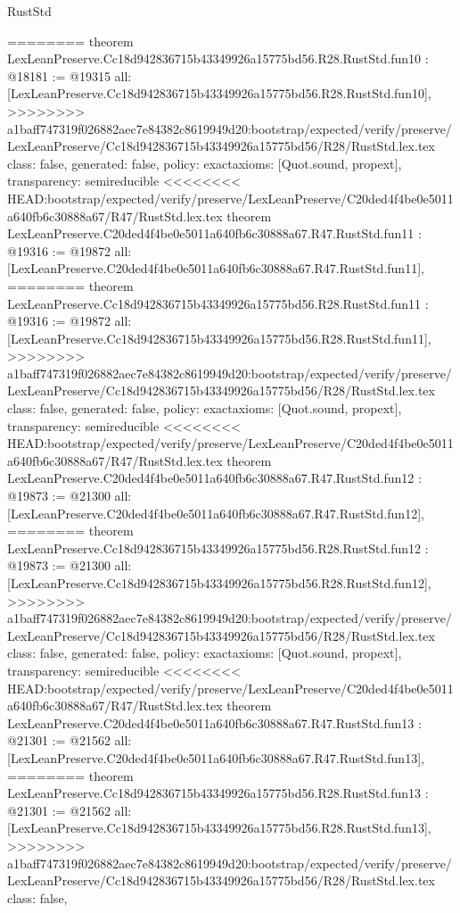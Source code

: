 \begin{lexlean}{RustStd}
\begin{coremodule}
{\begin{coremodule}
{{{{{{{{{{{{{========
theorem LexLeanPreserve.Cc18d942836715b43349926a15775bd56.R28.RustStd.fun10 : @18181 := @19315 {
  all: [LexLeanPreserve.Cc18d942836715b43349926a15775bd56.R28.RustStd.fun10],
>>>>>>>> a1baff747319f026882aec7e84382c8619949d20:bootstrap/expected/verify/preserve/LexLeanPreserve/Cc18d942836715b43349926a15775bd56/R28/RustStd.lex.tex
  class: false,
  generated: false,
  policy: exact{axioms: [Quot.sound, propext]},
  transparency: semireducible
}
<<<<<<<< HEAD:bootstrap/expected/verify/preserve/LexLeanPreserve/C20ded4f4be0e5011a640fb6c30888a67/R47/RustStd.lex.tex
theorem LexLeanPreserve.C20ded4f4be0e5011a640fb6c30888a67.R47.RustStd.fun11 : @19316 := @19872 {
  all: [LexLeanPreserve.C20ded4f4be0e5011a640fb6c30888a67.R47.RustStd.fun11],
========
theorem LexLeanPreserve.Cc18d942836715b43349926a15775bd56.R28.RustStd.fun11 : @19316 := @19872 {
  all: [LexLeanPreserve.Cc18d942836715b43349926a15775bd56.R28.RustStd.fun11],
>>>>>>>> a1baff747319f026882aec7e84382c8619949d20:bootstrap/expected/verify/preserve/LexLeanPreserve/Cc18d942836715b43349926a15775bd56/R28/RustStd.lex.tex
  class: false,
  generated: false,
  policy: exact{axioms: [Quot.sound, propext]},
  transparency: semireducible
}
<<<<<<<< HEAD:bootstrap/expected/verify/preserve/LexLeanPreserve/C20ded4f4be0e5011a640fb6c30888a67/R47/RustStd.lex.tex
theorem LexLeanPreserve.C20ded4f4be0e5011a640fb6c30888a67.R47.RustStd.fun12 : @19873 := @21300 {
  all: [LexLeanPreserve.C20ded4f4be0e5011a640fb6c30888a67.R47.RustStd.fun12],
========
theorem LexLeanPreserve.Cc18d942836715b43349926a15775bd56.R28.RustStd.fun12 : @19873 := @21300 {
  all: [LexLeanPreserve.Cc18d942836715b43349926a15775bd56.R28.RustStd.fun12],
>>>>>>>> a1baff747319f026882aec7e84382c8619949d20:bootstrap/expected/verify/preserve/LexLeanPreserve/Cc18d942836715b43349926a15775bd56/R28/RustStd.lex.tex
  class: false,
  generated: false,
  policy: exact{axioms: [Quot.sound, propext]},
  transparency: semireducible
}
<<<<<<<< HEAD:bootstrap/expected/verify/preserve/LexLeanPreserve/C20ded4f4be0e5011a640fb6c30888a67/R47/RustStd.lex.tex
theorem LexLeanPreserve.C20ded4f4be0e5011a640fb6c30888a67.R47.RustStd.fun13 : @21301 := @21562 {
  all: [LexLeanPreserve.C20ded4f4be0e5011a640fb6c30888a67.R47.RustStd.fun13],
========
theorem LexLeanPreserve.Cc18d942836715b43349926a15775bd56.R28.RustStd.fun13 : @21301 := @21562 {
  all: [LexLeanPreserve.Cc18d942836715b43349926a15775bd56.R28.RustStd.fun13],
>>>>>>>> a1baff747319f026882aec7e84382c8619949d20:bootstrap/expected/verify/preserve/LexLeanPreserve/Cc18d942836715b43349926a15775bd56/R28/RustStd.lex.tex
  class: false,
}}}}}}}}}}}}}}}}}
\end{coremodule}}
\end{coremodule}
\end{lexlean}
